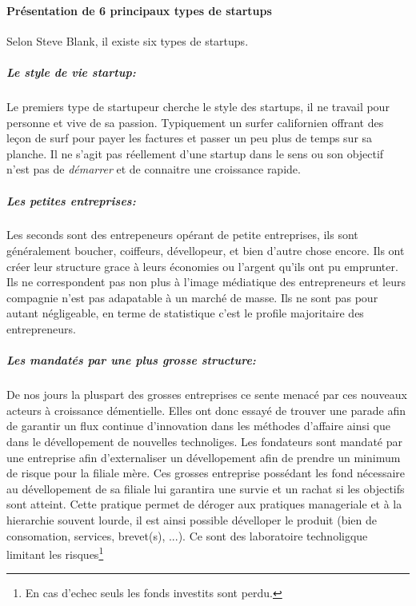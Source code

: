 \documentclass[11pt, a4paper ]{article}
\begin{document}
\begin{spacing}{1.5}
		\paragraph{Présentation de 6 principaux types de startups}
Selon Steve Blank\cite{typeStartup}, il existe six types de startups\cite{typeStartup}. 
			\subparagraph{Le style de vie startup:} %
Le premiers type de startupeur cherche le style des startups, il ne travail pour personne et vive de sa passion. Typiquement un surfer californien offrant des leçon de surf pour payer les factures et passer un peu plus de temps sur sa planche. Il ne s'agit pas réellement d'une startup dans le sens ou son objectif n'est pas de \emph{démarrer} et de connaitre une croissance rapide. 
			
			\subparagraph{Les petites entreprises:} %
Les seconds sont des entrepeneurs opérant de petite entreprises, ils sont généralement boucher, coiffeurs, dévellopeur, et bien d'autre chose encore. Ils ont créer leur structure grace à leurs économies ou l'argent qu'ils ont pu emprunter. Ils ne correspondent pas non plus à l'image médiatique des entrepreneurs et leurs compagnie n'est pas adapatable à un marché de masse. Ils ne sont pas pour autant négligeable, en terme de statistique c'est le profile majoritaire des entrepreneurs. 
			
			\subparagraph{Les mandatés par une plus grosse structure:} %
De nos jours la pluspart des grosses entreprises ce sente menacé par ces nouveaux acteurs à croissance démentielle. Elles ont donc essayé de trouver une parade afin de garantir un flux continue d'innovation dans les méthodes d'affaire ainsi que dans le dévellopement de nouvelles technoliges. Les fondateurs sont mandaté par une entreprise afin d'externaliser un dévellopement afin de prendre un minimum de risque pour la filiale mère. Ces grosses entreprise possédant les fond nécessaire au dévellopement de sa filiale lui garantira une survie et un rachat si les objectifs sont atteint. Cette pratique permet de déroger aux pratiques manageriale et à la hierarchie souvent lourde, il est ainsi possible dévelloper le produit (bien de consomation, services, brevet(s), ...). Ce sont des laboratoire technoligque limitant les risques\footnote{En cas d'echec seuls les fonds investits sont perdu.}


\end{spacing}
\end{document}
